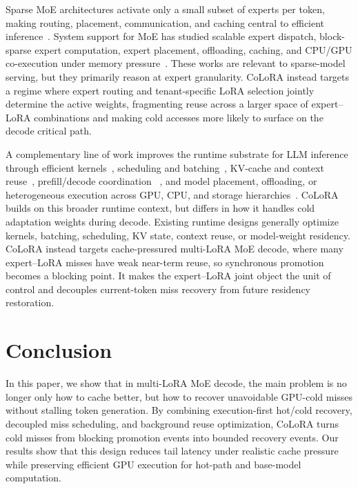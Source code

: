 \documentclass[sigplan,anonymous,review,10pt]{acmart}
\begin{document}
Sparse MoE architectures activate only a small subset of experts per token, making routing, placement, communication, and caching central to efficient inference~\cite{shazeer2017outrageously,fedus2022switch,zoph2022st,zhou2022mixture,jiang2024mixtral,zhu2024deepseek}. System support for MoE has studied scalable expert dispatch, block-sparse expert computation, expert placement, offloading, caching, and CPU/GPU co-execution under memory pressure~\cite{hwang2023tutel,gale2023megablocks,rajbhandari2022deepspeedmoe,xue2024moe,kamahori2024fiddler,yu2025fmoe,zhong2025hybrimoe,cao2025moe}. These works are relevant to sparse-model serving, but they primarily reason at expert granularity. CoLoRA instead targets a regime where expert routing and tenant-specific LoRA selection jointly determine the active weights, fragmenting reuse across a larger space of expert--LoRA combinations and making cold accesses more likely to surface on the decode critical path.

A complementary line of work improves the runtime substrate for LLM inference through efficient kernels~\cite{pope2023efficiently,dao2022flashattention,dao2024flashattention2}, scheduling and batching~\cite{yu2022orca,wu2026fastserve}, KV-cache and context reuse~\cite{kwon2023efficient,zheng2024sglang,prabhu2025vattention,liu2024cachegen,jin2025ragcache}, prefill/decode coordination ~\cite{agrawal2023sarathi,patel2024splitwise,zhong2024distserve}, and model placement, offloading, or heterogeneous execution across GPU, CPU, and storage hierarchies~\cite{li2023alpaserve,aminabadi2022deepspeed,sheng2023flexgen,na2025flexinfer,he2024fastdecode}. CoLoRA builds on this broader runtime context, but differs in how it handles cold adaptation weights during decode. Existing runtime designs generally optimize kernels, batching, scheduling, KV state, context reuse, or model-weight residency. CoLoRA instead targets cache-pressured multi-LoRA MoE decode, where many expert--LoRA misses have weak near-term reuse, so synchronous promotion becomes a blocking point. It makes the expert--LoRA joint object the unit of control and decouples current-token miss recovery from future residency restoration.


\section{Conclusion}

In this paper, we show that in multi-LoRA MoE decode, the main problem is no longer only how to cache better, but how to recover unavoidable GPU-cold misses without stalling token generation. By combining execution-first hot/cold recovery, decoupled miss scheduling, and background reuse optimization, CoLoRA turns cold misses from blocking promotion events into bounded recovery events. Our results show that this design reduces tail latency under realistic cache pressure while preserving efficient GPU execution for hot-path and base-model computation.
\end{document}
